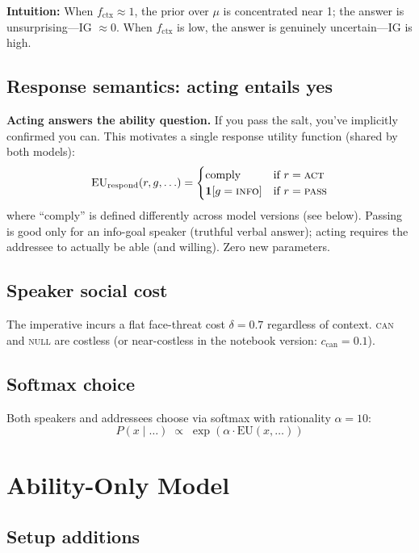 \documentclass[11pt]{article}
\begin{document}
\textbf{Intuition:} When $f_{\text{ctx}} \approx 1$, the prior over $\mu$ is
concentrated near 1; the answer is unsurprising---IG $\approx 0$. When
$f_{\text{ctx}}$ is low, the answer is genuinely uncertain---IG is high.

\subsection{Response semantics: acting entails yes}

\textbf{Acting answers the ability question.} If you pass the salt, you've implicitly
confirmed you can. This motivates a single response utility function (shared by both models):
\[
  \mathrm{EU}_{\text{respond}}(r, g, \ldots) =
  \begin{cases}
    \text{comply} & \text{if } r = \textsc{act} \\
    \mathbf{1}[g = \textsc{info}] & \text{if } r = \textsc{pass}
  \end{cases}
\]
where ``comply'' is defined differently across model versions (see below).
Passing is good only for an info-goal speaker (truthful verbal answer); acting
requires the addressee to actually be able (and willing). Zero new parameters.

\subsection{Speaker social cost}

The imperative incurs a flat face-threat cost $\delta = 0.7$ regardless of context.
\textsc{can} and \textsc{null} are costless (or near-costless in the notebook
version: $c_{\text{can}} = 0.1$).

\subsection{Softmax choice}

Both speakers and addressees choose via softmax with rationality $\alpha = 10$:
\[
  P(x \mid \ldots) \;\propto\; \exp\!\left(\alpha \cdot \mathrm{EU}(x, \ldots)\right)
\]

\section{Ability-Only Model}
\label{sec:ability}

\subsection{Setup additions}
\end{document}
